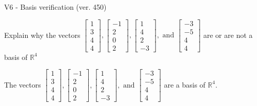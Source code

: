 \begin{exercise}
  \begin{exerciseTitle}V6 - Basis verification (ver. 450)\end{exerciseTitle}
  \begin{exerciseStatement}
    Explain why the vectors \(\left[\begin{array}{r}
1 \\
3 \\
4 \\
4
\end{array}\right] , \left[\begin{array}{r}
-1 \\
2 \\
0 \\
2
\end{array}\right] , \left[\begin{array}{r}
1 \\
4 \\
2 \\
-3
\end{array}\right] , \text{ and } \left[\begin{array}{r}
-3 \\
-5 \\
4 \\
4
\end{array}\right]\) are or are not a basis of \(\mathbb{R}^4\)	


  \end{exerciseStatement}
  \begin{exerciseAnswer}
   The vectors \(\left[\begin{array}{r}
1 \\
3 \\
4 \\
4
\end{array}\right] , \left[\begin{array}{r}
-1 \\
2 \\
0 \\
2
\end{array}\right] , \left[\begin{array}{r}
1 \\
4 \\
2 \\
-3
\end{array}\right] , \text{ and } \left[\begin{array}{r}
-3 \\
-5 \\
4 \\
4
\end{array}\right]\) 
  	 are  a basis of \(\mathbb{R}^4\).
  


  \end{exerciseAnswer}
\end{exercise}